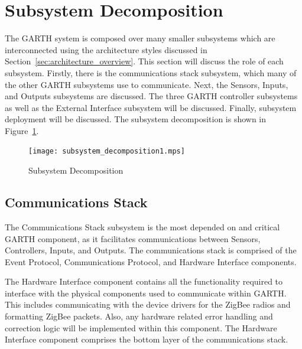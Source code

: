 \documentclass{report}
\begin{document}
\section{Subsystem Decomposition}


The GARTH system is composed over many smaller subsystems which are
interconnected using the architecture styles discussed in
Section~\ref{sec:architecture_overview}. This section will discuss the
role of each subsystem. Firstly, there is the communications stack
subsystem, which many of the other GARTH subsystems use to
communicate. Next, the Sensors, Inputs, and Outputs subsystems are
discussed. The three GARTH controller subsystems as well as the
External Interface subsystem will be discussed. Finally, subsystem
deployment will be discussed.  The subsystem decomposition is shown in
Figure~\ref{fig:subsystem_decomposition}.

\begin{figure}[hp]
    \centering
        \caption{Subsystem Decomposition}
        \scriptsize
        \setlength{\unitlength}{2.0em}
        \texttt{[image: subsystem\_decomposition1.mps]}
        \normalsize
    \label{fig:subsystem_decomposition}
\end{figure}

\subsection{Communications Stack}

The Communications Stack subsystem is the most depended on and critical
GARTH component, as it facilitates communications between Sensors,
Controllers, Inputs, and Outputs. The communications stack is
comprised of the Event Protocol, Communications Protocol, and Hardware
Interface components.

The Hardware Interface component contains all the
functionality required to interface with the physical components used
to communicate within GARTH. This includes communicating with the
device drivers for the ZigBee radios and formatting ZigBee packets.
Also, any hardware related error handling and correction logic will be
implemented within this component. The Hardware Interface component
comprises the bottom layer of the communications stack.
\end{document}
